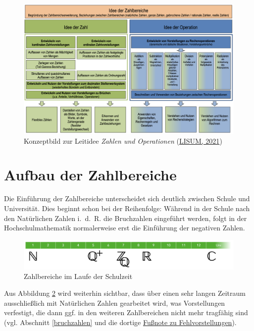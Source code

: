 \documentclass[
  ngerman,
]{scrbook}
\theoremstyle{definition}
\theoremstyle{definition}
\theoremstyle{definition}
\theoremstyle{definition}
\theoremstyle{remark}
\begin{document}
\begin{figure}

{\centering \includegraphics[width=0.9\linewidth]{pictures/A-KonzeptZahl} 

}

\caption{Konzeptbild zur Leitidee \emph{Zahlen und Operationen} (\protect\hyperlink{ref-LISUM2021}{LISUM, 2021})}\label{fig:KonzeptZahl}
\end{figure}

\hypertarget{aufbau-der-zahlbereiche}{%
\section{Aufbau der Zahlbereiche}\label{aufbau-der-zahlbereiche}}

Die Einführung der Zahlbereiche unterscheidet sich deutlich zwischen Schule und Universität. Dies beginnt schon bei der Reihenfolge: Während in der Schule nach den Natürlichen Zahlen i.~d.~R. die Bruchzahlen eingeführt werden, folgt in der Hochschulmathematik normalerweise erst die Einführung der negativen Zahlen.

\begin{figure}

{\centering \includegraphics[width=1\linewidth]{pictures/A-ZahlReihenfolge} 

}

\caption{Zahlbereiche im Laufe der Schulzeit}\label{fig:ZahlReihenfolge}
\end{figure}

Aus Abbildung \ref{fig:ZahlReihenfolge} wird weiterhin sichtbar, dass über einen sehr langen Zeitraum ausschließlich mit Natürlichen Zahlen gearbeitet wird, was Vorstellungen verfestigt, die dann ggf. in den weiteren Zahlbereichen nicht mehr tragfähig sind (vgl. Abschnitt \ref{bruchzahlen} und die dortige \protect\hyperlink{fn5}{Fußnote zu Fehlvorstellungen}).
\end{document}

